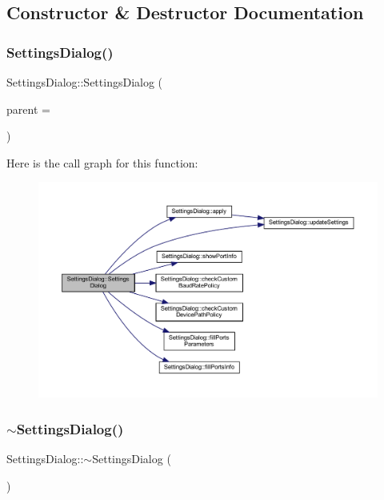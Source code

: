 \subsection{Constructor \& Destructor Documentation}
\mbox{\label{class_settings_dialog_a9933956b777b2c0451e9119581cc22fb}} 
\subsubsection{\texorpdfstring{SettingsDialog()}{SettingsDialog()}}
{\footnotesize\ttfamily Settings\+Dialog\+::\+Settings\+Dialog (\begin{DoxyParamCaption}\item[{Q\+Widget $\ast$}]{parent = {} }\end{DoxyParamCaption})\hspace{0.3cm}{\ttfamily [explicit]}}

Here is the call graph for this function\+:
\nopagebreak
\begin{figure}[H]
\begin{center}
\leavevmode
\includegraphics[width=350pt]{class_settings_dialog_a9933956b777b2c0451e9119581cc22fb_cgraph}
\end{center}
\end{figure}
\mbox{\label{class_settings_dialog_ac48f54d4472902be0a3845a69167f068}} 
\subsubsection{\texorpdfstring{$\sim$SettingsDialog()}{~SettingsDialog()}}
{\footnotesize\ttfamily Settings\+Dialog\+::$\sim$\+Settings\+Dialog (\begin{DoxyParamCaption}{ }\end{DoxyParamCaption})}



